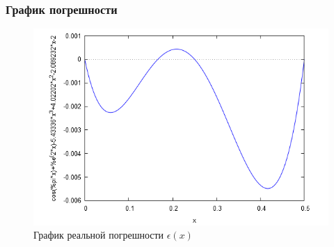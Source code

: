 \subsubsection{График погрешности}

\begin{figure}[H]
	\begin{center}
		\includegraphics[width=15cm]{newton.png}
		\caption{График реальной погрешности $\epsilon(x)$} 
		\label{pic:1}
	\end{center}
\end{figure}


